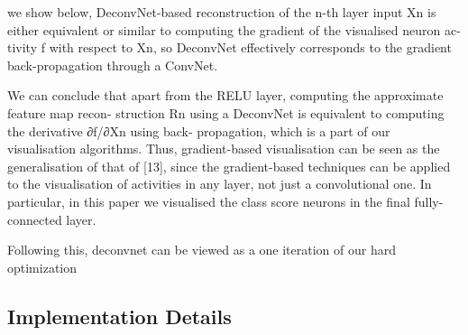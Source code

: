we show below, DeconvNet-based reconstruction of the n-th layer input Xn is either equivalent or similar to computing the gradient of the visualised neuron ac-tivity f with respect to Xn, so DeconvNet effectively corresponds to the gradient back-propagation through a ConvNet.

We can conclude that apart from the RELU layer, computing the approximate feature map recon- struction Rn using a DeconvNet is equivalent to computing the derivative ∂f/∂Xn using back- propagation, which is a part of our visualisation algorithms. Thus, gradient-based visualisation can be seen as the generalisation of that of [13], since the gradient-based techniques can be applied to the visualisation of activities in any layer, not just a convolutional one. In particular, in this paper we visualised the class score neurons in the final fully-connected layer.

Following this, deconvnet can be viewed as a one iteration of our hard optimization

\subsection{Implementation Details}


